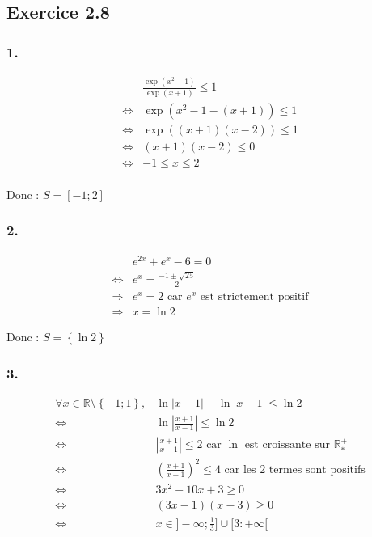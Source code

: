 \documentclass[a4paper,10pt]{report}
\begin{document}
\subsection*{Exercice 2.8}

\subsubsection*{1.}
\begin{equation*}
	\begin{split}
		&\frac{\exp(x^2-1)}{\exp(x+1)} \leq 1 \\
		\Longleftrightarrow &\exp(x^2-1 -(x+1)) \leq 1 \\
		\Longleftrightarrow &\exp((x+1)(x-2)) \leq 1 \\
		\Longleftrightarrow &(x+1)(x-2) \leq 0 \\
		\Longleftrightarrow & -1 \leq x \leq 2 \\
	\end{split}
\end{equation*}

Donc : $S= [-1 ; 2]$

\subsubsection*{2.}
\begin{equation*}
	\begin{split}
		& e^{2x} + e^x -6 = 0 \\
		\Longleftrightarrow & e^x = \frac{-1\pm \sqrt{25}}{2} \\
		\Longrightarrow & e^x = 2 \text{ car $e^x$ est strictement positif} \\
		\Longrightarrow & x = \ln 2
	\end{split}
\end{equation*}

Donc : $S=\left\lbrace \ln 2 \right\rbrace$

\subsubsection*{3.}
\begin{equation*}
	\begin{split}
		\forall x \in \mathbb{R} \setminus \left\lbrace -1 ; 1 \right\rbrace, & \ln |x+1| - \ln |x-1| \leq \ln 2 \\
		\Longleftrightarrow & \ln \left| \frac{x+1}{x-1} \right| \leq \ln 2 \\
		\Longleftrightarrow & \left| \frac{x+1}{x-1} \right| \leq 2 \text{ car $\ln$ est croissante sur $\mathbb{R}^{+}_{*}$} \\
		\Longleftrightarrow & \left( \frac{x+1}{x-1} \right)^2 \leq 4 \text{ car les 2 termes sont positifs} \\
		\Longleftrightarrow & 3x^2-10x+3 \geq 0 \\
		\Longleftrightarrow & (3x-1)(x-3) \geq 0 \\
		\Longleftrightarrow & x \in ]-\infty ; \frac{1}{3}] \cup [3 : +\infty[ \\
	\end{split}
\end{equation*}
\end{document}
